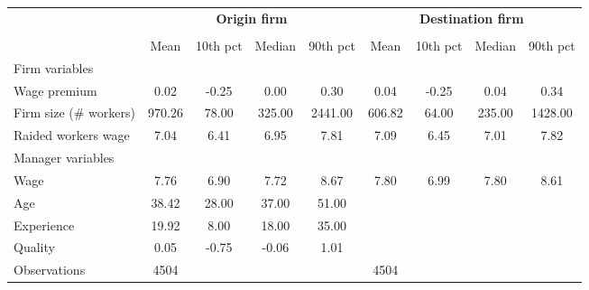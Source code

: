 {
\def\sym#1{\ifmmode^{#1}\else\(^{#1}\)\fi}
\begin{tabular}{l*{2}{cccc}}
\toprule
                    &\multicolumn{4}{c}{\textbf{Origin firm}}           &\multicolumn{4}{c}{\textbf{Destination firm}}      \\\cmidrule(lr){2-5}\cmidrule(lr){6-9}
                    &\multicolumn{4}{c}{}                               &\multicolumn{4}{c}{}                               \\
                    &        Mean&    10th pct&      Median&    90th pct&        Mean&    10th pct&      Median&    90th pct\\
\midrule
Firm variables      &            &            &            &            &            &            &            &            \\
Wage premium        &        0.02&       -0.25&        0.00&        0.30&        0.04&       -0.25&        0.04&        0.34\\
Firm size (\# workers)&      970.26&       78.00&      325.00&     2441.00&      606.82&       64.00&      235.00&     1428.00\\
Raided workers wage &        7.04&        6.41&        6.95&        7.81&        7.09&        6.45&        7.01&        7.82\\
Manager variables   &            &            &            &            &            &            &            &            \\
Wage                &        7.76&        6.90&        7.72&        8.67&        7.80&        6.99&        7.80&        8.61\\
Age                 &       38.42&       28.00&       37.00&       51.00&            &            &            &            \\
Experience          &       19.92&        8.00&       18.00&       35.00&            &            &            &            \\
Quality             &        0.05&       -0.75&       -0.06&        1.01&            &            &            &            \\
\midrule
Observations        &        4504&            &            &            &        4504&            &            &            \\
\bottomrule
\end{tabular}
}

